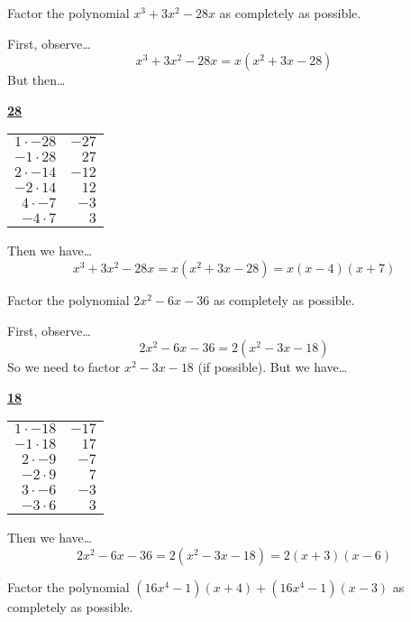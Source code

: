 \documentclass[12pt,letterpaper]{exam}
\begin{document}
\begin{questions}
\newpage
\question[10] Factor the polynomial $x^3 + 3x^2 - 28x$ as completely as possible. \pspace

\sol First, observe\dots
	\[
	x^3 + 3x^2 - 28x= x(x^2 + 3x - 28)
	\]
But then\dots \par
	\begin{table}[!ht]
	\centering
	\underline{\bfseries 28} \pvspace{0.2cm}
	\begin{tabular}{rr}
	$1 \cdot -28$ & $-27$ \\
	$-1 \cdot 28$ & $27$ \\
	$2 \cdot -14$ & $-12$ \\
	$-2 \cdot 14$ & $12$ \\
	$4 \cdot -7$ & $-3$ \\ \hline
	\multicolumn{1}{|r}{$-4 \cdot 7$} & \multicolumn{1}{r|}{$3$} \\ \hline
	\end{tabular}
	\end{table}
Then we have\dots
	\[
	x^3 + 3x^2 - 28x= x(x^2 + 3x - 28)= x(x - 4)(x + 7)
	\]



\newpage
\question[10] Factor the polynomial $2x^2 - 6x - 36$ as completely as possible. \pspace

\sol First, observe\dots
	\[
	2x^2 - 6x - 36= 2(x^2 - 3x - 18)
	\]
So we need to factor $x^2 - 3x - 18$ (if possible). But we have\dots \par
	\begin{table}[!ht]
	\centering
	\underline{\bfseries 18} \pvspace{0.2cm}
	\begin{tabular}{rr}
	$1 \cdot -18$ & $-17$ \\
	$-1 \cdot 18$ & $17$ \\
	$2 \cdot -9$ & $-7$ \\
	$-2 \cdot 9$ & $7$ \\ \hline
	\multicolumn{1}{|r}{$3 \cdot -6$} & \multicolumn{1}{r|}{$-3$} \\ \hline
	$-3 \cdot 6$ & $3$
	\end{tabular}
	\end{table}
Then we have\dots
	\[
	2x^2 - 6x - 36= 2(x^2 - 3x - 18)= 2(x + 3)(x - 6)
	\]



\newpage
\question[10] Factor the polynomial $(16x^4 - 1)(x + 4) + (16x^4 - 1)(x - 3)$ as completely as possible. \pspace


\end{questions}
\end{document}
